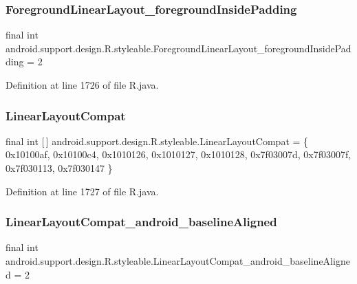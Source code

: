 \subsubsection{\texorpdfstring{ForegroundLinearLayout\_foregroundInsidePadding}{ForegroundLinearLayout\_foregroundInsidePadding}}
{\footnotesize\ttfamily final int android.\+support.\+design.\+R.\+styleable.\+Foreground\+Linear\+Layout\+\_\+foreground\+Inside\+Padding = 2\hspace{0.3cm}{\ttfamily [static]}}



Definition at line 1726 of file R.\+java.

\mbox{\label{classandroid_1_1support_1_1design_1_1_r_1_1styleable_a00b7e2da5bc1f659d80ac76716119713}} 
\subsubsection{\texorpdfstring{LinearLayoutCompat}{LinearLayoutCompat}}
{\footnotesize\ttfamily final int \mbox{[}$\,$\mbox{]} android.\+support.\+design.\+R.\+styleable.\+Linear\+Layout\+Compat = \{ 0x10100af, 0x10100c4, 0x1010126, 0x1010127, 0x1010128, 0x7f03007d, 0x7f03007f, 0x7f030113, 0x7f030147 \}\hspace{0.3cm}{\ttfamily [static]}}



Definition at line 1727 of file R.\+java.

\mbox{\label{classandroid_1_1support_1_1design_1_1_r_1_1styleable_a22effd7a7321cd1d30a0fdf070aa0fd9}} 
\subsubsection{\texorpdfstring{LinearLayoutCompat\_android\_baselineAligned}{LinearLayoutCompat\_android\_baselineAligned}}
{\footnotesize\ttfamily final int android.\+support.\+design.\+R.\+styleable.\+Linear\+Layout\+Compat\+\_\+android\+\_\+baseline\+Aligned = 2\hspace{0.3cm}{\ttfamily [static]}}



